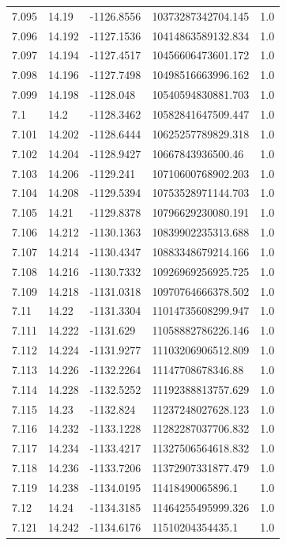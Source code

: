 \begin{tabular}{lllll}
7.095 & 14.19 & -1126.8556 & 10373287342704.145 & 1.0 \\
7.096 & 14.192 & -1127.1536 & 10414863589132.834 & 1.0 \\
7.097 & 14.194 & -1127.4517 & 10456606473601.172 & 1.0 \\
7.098 & 14.196 & -1127.7498 & 10498516663996.162 & 1.0 \\
7.099 & 14.198 & -1128.048 & 10540594830881.703 & 1.0 \\
7.1 & 14.2 & -1128.3462 & 10582841647509.447 & 1.0 \\
7.101 & 14.202 & -1128.6444 & 10625257789829.318 & 1.0 \\
7.102 & 14.204 & -1128.9427 & 10667843936500.46 & 1.0 \\
7.103 & 14.206 & -1129.241 & 10710600768902.203 & 1.0 \\
7.104 & 14.208 & -1129.5394 & 10753528971144.703 & 1.0 \\
7.105 & 14.21 & -1129.8378 & 10796629230080.191 & 1.0 \\
7.106 & 14.212 & -1130.1363 & 10839902235313.688 & 1.0 \\
7.107 & 14.214 & -1130.4347 & 10883348679214.166 & 1.0 \\
7.108 & 14.216 & -1130.7332 & 10926969256925.725 & 1.0 \\
7.109 & 14.218 & -1131.0318 & 10970764666378.502 & 1.0 \\
7.11 & 14.22 & -1131.3304 & 11014735608299.947 & 1.0 \\
7.111 & 14.222 & -1131.629 & 11058882786226.146 & 1.0 \\
7.112 & 14.224 & -1131.9277 & 11103206906512.809 & 1.0 \\
7.113 & 14.226 & -1132.2264 & 11147708678346.88 & 1.0 \\
7.114 & 14.228 & -1132.5252 & 11192388813757.629 & 1.0 \\
7.115 & 14.23 & -1132.824 & 11237248027628.123 & 1.0 \\
7.116 & 14.232 & -1133.1228 & 11282287037706.832 & 1.0 \\
7.117 & 14.234 & -1133.4217 & 11327506564618.832 & 1.0 \\
7.118 & 14.236 & -1133.7206 & 11372907331877.479 & 1.0 \\
7.119 & 14.238 & -1134.0195 & 11418490065896.1 & 1.0 \\
7.12 & 14.24 & -1134.3185 & 11464255495999.326 & 1.0 \\
7.121 & 14.242 & -1134.6176 & 11510204354435.1 & 1.0 \\

\end{tabular}
